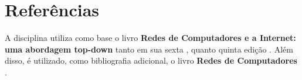 \documentclass{article}
\begin{document}
\section{Referências}
A disciplina utiliza como base o livro \textbf{Redes de Computadores e a Internet: uma abordagem top-down} tanto em sua sexta \cite{kurose6}, quanto quinta edição \cite{kurose5}. Além disso, é utilizado, como bibliografia adicional, o livro \textbf{Redes de Computadores} \cite{tanenbaum}.



\end{document}
